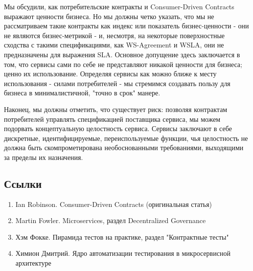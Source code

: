 \documentclass[11pt]{article}
\providecommand{\tightlist}{%
      \setlength{\itemsep}{0pt}\setlength{\parskip}{0pt}}
\begin{document}
Мы обсудили, как потребительские контракты и Consumer-Driven Contracts
выражают ценности бизнеса. Но мы должны четко указать, что мы не
рассматриваем такие контракты как индекс или показатель бизнес-ценности
- они не являются бизнес-метрикой - и, несмотря, на некоторые
поверхностные сходства с такими спецификациями, как WS-Agreement и WSLA,
они не предназначены для выражения SLA. Основное допущение здесь
заключается в том, что сервисы сами по себе не представляют никакой
ценности для бизнеса; ценно их использование. Определяя сервисы как
можно ближе к месту использования - силами потребителей - мы стремимся
создавать пользу для бизнеса в минималистичной, "точно в срок" манере.

Наконец, мы должны отметить, что существует риск: позволяя контрактам
потребителей управлять спецификацией поставщика сервиса, мы можем
подорвать концептуальную целостность сервиса. Сервисы заключают в себе
дискретные, идентифицируемые, переиспользуемые функции, чья целостность
не должна быть скомпрометирована необоснованными требованиями,
выходящими за пределы их назначения.

    \subsection{Ссылки}\label{ux441ux441ux44bux43bux43aux438}

\begin{enumerate}
\def\labelenumi{\arabic{enumi}.}
\tightlist
\item
  Ian Robinson. Consumer-Driven Contracts (оригинальная статья)
\item
  Martin Fowler. Microservices, раздел Decentralized Governance
\item
  Хэм Фокке. Пирамида тестов на практике, раздел "Контрактные тесты"
\item
  Химион Дмитрий. Ядро автоматизации тестирования в микросервисной
  архитектуре
\end{enumerate}


    
    
    
    
\end{document}
